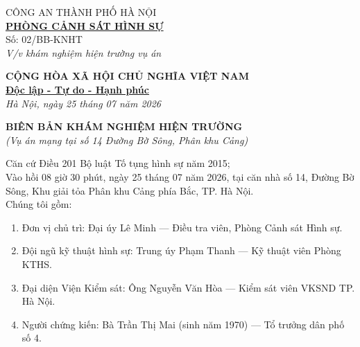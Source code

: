 \documentclass[12pt,a4paper]{article}
\begin{document}
\noindent
\begin{minipage}[t]{0.45\textwidth}
    \begin{center}
        \small
        CÔNG AN THÀNH PHỐ HÀ NỘI\\
        \textbf{\underline{PHÒNG CẢNH SÁT HÌNH SỰ}}\\[0.1cm]
        Số: 02/BB-KNHT\\
        \textit{V/v khám nghiệm hiện trường vụ án}
    \end{center}
\end{minipage}
\hfill
\begin{minipage}[t]{0.52\textwidth}
    \begin{center}
        \small
        \textbf{CỘNG HÒA XÃ HỘI CHỦ NGHĨA VIỆT NAM}\\
        \textbf{\underline{Độc lập - Tự do - Hạnh phúc}}\\[0.1cm]
        \textit{Hà Nội, ngày 25 tháng 07 năm 2026}
    \end{center}
\end{minipage}

\vspace{0.6cm}

\begin{center}
    \textbf{\large BIÊN BẢN KHÁM NGHIỆM HIỆN TRƯỜNG}\\
    \textit{(Vụ án mạng tại số 14 Đường Bờ Sông, Phân khu Cảng)}
\end{center}

\vspace{0.3cm}

\noindent Căn cứ Điều 201 Bộ luật Tố tụng hình sự năm 2015;\\
Vào hồi 08 giờ 30 phút, ngày 25 tháng 07 năm 2026, tại căn nhà số 14, Đường Bờ Sông, Khu giải tỏa Phân khu Cảng phía Bắc, TP. Hà Nội.\\
Chúng tôi gồm:
\begin{enumerate}[label=\arabic*., leftmargin=1.5cm]
    \item Đơn vị chủ trì: Đại úy Lê Minh — Điều tra viên, Phòng Cảnh sát Hình sự.
    \item Đội ngũ kỹ thuật hình sự: Trung úy Phạm Thanh — Kỹ thuật viên Phòng KTHS.
    \item Đại diện Viện Kiểm sát: Ông Nguyễn Văn Hòa — Kiểm sát viên VKSND TP. Hà Nội.
    \item Người chứng kiến: Bà Trần Thị Mai (sinh năm 1970) — Tổ trưởng dân phố số 4.
\end{enumerate}
\end{document}
